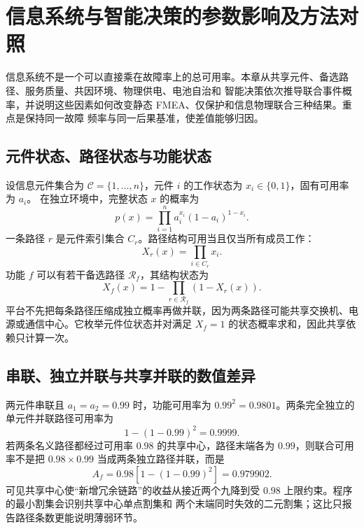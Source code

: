 \section{信息系统与智能决策的参数影响及方法对照}\label{sec:rel-cyber-impact-cases}

信息系统不是一个可以直接乘在故障率上的总可用率。本章从共享元件、备选路径、服务质量、共因环境、物理供电、电池自治和
智能决策依次推导联合事件概率，并说明这些因素如何改变静态 FMEA、仅保护和信息物理联合三种结果。重点是保持同一故障
频率与同一后果基准，使差值能够归因。

\subsection{元件状态、路径状态与功能状态}
设信息元件集合为 $\mathcal C=\{1,\ldots,n\}$，元件 $i$ 的工作状态为 $x_i\in\{0,1\}$，固有可用率为 $a_i$。
在独立环境中，完整状态 $x$ 的概率为
\begin{equation}\label{eq:rel-cyber-state-probability}
 p(x)=\prod_{i=1}^{n}a_i^{x_i}(1-a_i)^{1-x_i}.
\end{equation}
一条路径 $r$ 是元件索引集合 $C_r$。路径结构可用当且仅当所有成员工作：
\begin{equation}
 X_r(x)=\prod_{i\in C_r}x_i.
\end{equation}
功能 $f$ 可以有若干备选路径 $\mathcal R_f$，其结构状态为
\begin{equation}
 X_f(x)=1-\prod_{r\in\mathcal R_f}(1-X_r(x)).
\end{equation}
平台不先把每条路径压缩成独立概率再做并联，因为两条路径可能共享交换机、电源或通信中心。它枚举元件位状态并对满足
$X_f=1$ 的状态概率求和，因此共享依赖只计算一次。

\subsection{串联、独立并联与共享并联的数值差异}
两元件串联且 $a_1=a_2=0.99$ 时，功能可用率为 $0.99^2=0.9801$。两条完全独立的单元件并联路径可用率为
\begin{equation}
 1-(1-0.99)^2=0.9999.
\end{equation}
若两条名义路径都经过可用率 $0.98$ 的共享中心，路径末端各为 $0.99$，则联合可用率不是把
$0.98\times0.99$ 当成两条独立路径并联，而是
\begin{equation}
 A_f=0.98\left[1-(1-0.99)^2\right]=0.979902.
\end{equation}
可见共享中心使“新增冗余链路”的收益从接近两个九降到受 $0.98$ 上限约束。程序的最小割集会识别共享中心单点割集和
两个末端同时失效的二元割集；这比只报告路径条数更能说明薄弱环节。

